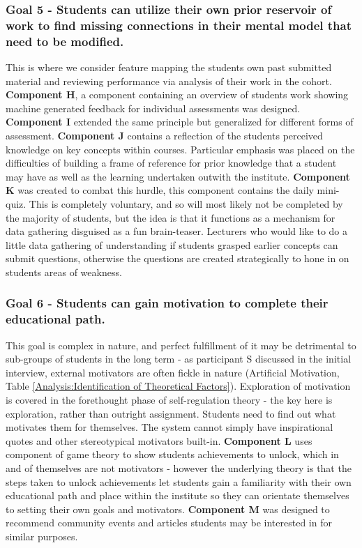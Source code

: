 \documentclass{l4proj}
\begin{document}
\subsubsection{Goal 5 - Students can utilize their own prior reservoir of work to find missing connections in their mental model that need to be modified. }
\hfill

This is where we consider feature mapping the students own past submitted material and reviewing performance via analysis of their work in the cohort. \textbf{Component H}, a component containing an overview of students work showing machine generated feedback for individual assessments was designed. \textbf{Component I} extended the same principle but generalized for different forms of assessment. \textbf{Component J} contains a reflection of the students perceived knowledge on key concepts within courses. Particular emphasis was placed on the difficulties of building a frame of reference for prior knowledge that a student may have as well as the learning undertaken outwith the institute. \textbf{Component K} was created to combat this hurdle, this component contains the daily mini-quiz. This is completely voluntary, and so will most likely not be completed by the majority of students, but the idea is that it functions as a mechanism for data gathering disguised as a fun brain-teaser. Lecturers who would like to do a little data gathering of understanding if students grasped earlier concepts can submit questions, otherwise the questions are created strategically to hone in on students areas of weakness.

\subsubsection{Goal 6 - Students can gain motivation to complete their educational path. }
\hfill

This goal is complex in nature, and perfect fulfillment of it may be detrimental to sub-groups of students in the long term - as participant S discussed in the initial interview, external motivators are often fickle in nature (Artificial Motivation, Table \ref{Analysis:Identification of Theoretical Factors}). Exploration of motivation is covered in the forethought phase of self-regulation theory - the key here is exploration, rather than outright assignment. Students need to find out what motivates them for themselves. The system cannot simply have inspirational quotes and other stereotypical motivators built-in. \textbf{Component L} uses component of game theory to show students achievements to unlock, which in and of themselves are not motivators - however the underlying theory is that the steps taken to unlock achievements let students gain a familiarity with their own educational path and place within the institute so they can orientate themselves to setting their own goals and motivators. \textbf{Component M} was designed to recommend community events and articles students may be interested in for similar purposes. 
\end{document}
